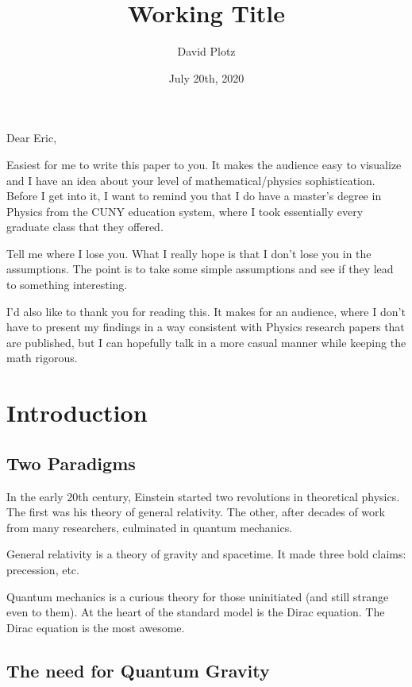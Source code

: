 \documentclass {article}
\begin{document}
\title{Working Title}
\author{David Plotz}
\date{July 20th, 2020}
\maketitle

Dear Eric,

Easiest for me to write this paper to you. It makes the audience easy to visualize and I have an idea about your level of mathematical/physics sophistication. Before I get into it, I want to remind you that I do have a master’s degree in Physics from the CUNY education system, where I took essentially every graduate class that they offered.

Tell me where I lose you. What I really hope is that I don’t lose you in the assumptions. The point is to take some simple assumptions and see if they lead to something interesting.

I’d also like to thank you for reading this. It makes for an audience, where I don’t have to present my findings in a way consistent with Physics research papers that are published, but I can hopefully talk in a more casual manner while keeping the math rigorous.


\section{Introduction}

\subsection{Two Paradigms}
In the early 20th century, Einstein started two revolutions in theoretical physics. The first was his theory of general relativity. The other, after decades of work from many researchers, culminated in quantum mechanics. 

General relativity is a theory of gravity and spacetime. It made three bold claims: precession, etc.

Quantum mechanics is a curious theory for those uninitiated (and still strange even to them). At the heart of the standard model is the Dirac equation. The Dirac equation is the most awesome.

\subsection{The need for Quantum Gravity}
\end{document}
